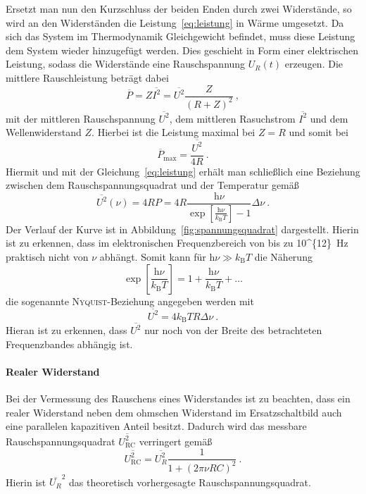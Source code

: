 Ersetzt man nun den Kurzschluss der beiden Enden durch zwei Widerstände,
so wird an den Widerständen die Leistung~\eqref{eq:leistung} in Wärme
umgesetzt.
Da sich das System im Thermodynamik Gleichgewicht befindet, muss diese Leistung
dem System wieder hinzugefügt werden.
Dies geschieht in Form einer elektrischen Leistung, sodass die Widerstände
eine Rauschspannung $U_R(t)$ erzeugen.
Die mittlere Rauschleistung beträgt dabei
\begin{equation}
  \overline{P} = Z \overline{I^2} = \overline{U^2} \frac{Z}{{(R+Z)}^2}~,
\end{equation}
mit der mittleren Rauschspannung $\overline{U^2}$, dem mittleren Rasuchstrom
$\overline{I^2}$ und dem Wellenwiderstand $Z$.
Hierbei ist die Leistung maximal bei $Z=R$ und somit bei
\begin{equation}
  \overline{P}_\text{max} = \frac{\overline{U^2}}{4R}~.
\end{equation}
Hiermit und mit der Gleichung~\eqref{eq:leistung} erhält man schließlich eine
Beziehung zwischen dem Rauschspannungsquadrat und der Temperatur gemäß
\begin{equation}
  \overline{U^2}(\nu) = 4RP = 4R
  \frac{\text{h}\nu}{\exp[\frac{\text{h}\nu}{k_\text{B}T}] - 1} \Delta \nu~.
\end{equation}
Der Verlauf der Kurve ist in Abbildung~\ref{fig:spannungsquadrat} dargestellt.
Hierin ist zu erkennen, dass im elektronischen Frequenzbereich von bis zu
\SI{10^{12}}{\hertz} praktisch nicht
von $\nu$ abhängt. Somit kann für $\text{h}\nu \gg k_\text{B}T$ die Näherung
\begin{equation}
  \exp[\frac{\text{h}\nu}{k_\text{B}T}] = 1 + \frac{\text{h} \nu}{k_\text{B}T}
  + \ldots
\end{equation}
die sogenannte \textsc{Nyquist}-Beziehung angegeben werden mit
\begin{equation}
  \overline{U^2} = 4 k_\text{B} T R \Delta \nu~.
  \label{eq:nyquist}
\end{equation}
Hieran ist zu erkennen, dass $\overline{U^2}$ nur noch von der Breite des
betrachteten Frequenzbandes abhängig ist.

\paragraph{Realer Widerstand}
\label{par:realer_widerstand}

Bei der Vermessung des Rauschens eines Widerstandes ist zu beachten, dass ein
realer Widerstand neben dem ohmschen Widerstand im Ersatzschaltbild auch eine
parallelen kapazitiven Anteil besitzt.
Dadurch wird das messbare Rauschspannungsquadrat $\overline{U_\text{RC}^2}$
verringert gemäß
\begin{equation}
  \overline{U_\text{RC}^2} = \overline{U_R^2} \frac{1}{1 + {(2\pi\nu RC)}^2}~.
\end{equation}
Hierin ist $\overline{U_R}^2$ das theoretisch vorhergesagte
Rauschspannungsquadrat.

